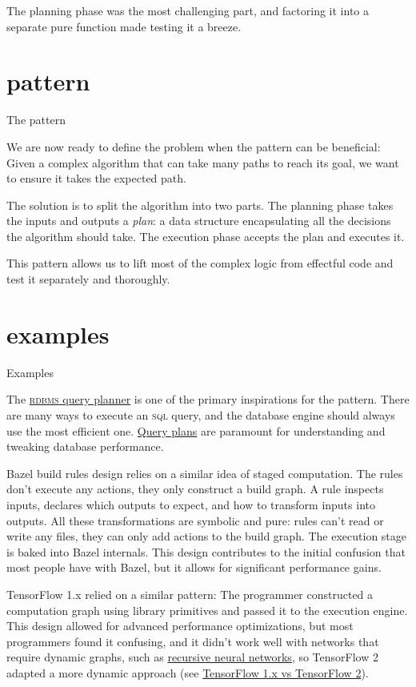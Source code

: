 \documentclass{article}
\begin{document}
The planning phase was the most challenging part, and factoring it into a separate pure function made testing it a breeze.

\section{pattern}{The pattern}

We are now ready to define the problem when the pattern can be beneficial:
Given a complex algorithm that can take many paths to reach its goal, we want to ensure it takes the expected path.

The solution is to split the algorithm into two parts.
The planning phase takes the inputs and outputs a \emph{plan}: a data structure encapsulating all the decisions the algorithm should take.
The execution phase accepts the plan and executes it.

This pattern allows us to lift most of the complex logic from effectful code and test it separately and thoroughly.

\section{examples}{Examples}

The \href{https://en.wikipedia.org/wiki/Query_plan}{\textsc{rdbms} query planner} is one of the primary inspirations for the pattern.
There are many ways to execute an \textsc{sql} query, and the database engine should always use the most efficient one.
\href{https://en.wikipedia.org/wiki/Query_plan}{Query plans} are paramount for understanding and tweaking database performance.

Bazel build rules design relies on a similar idea of staged computation.
The rules don't execute any actions, they only construct a build graph.
A rule inspects inputs, declares which outputs to expect, and how to transform inputs into outputs.
All these transformations are symbolic and pure: rules can't read or write any files, they can only add actions to the build graph.
The execution stage is baked into Bazel internals.
This design contributes to the initial confusion that most people have with Bazel, but it allows for significant performance gains.

TensorFlow 1.x relied on a similar pattern:
The programmer constructed a computation graph using library primitives and passed it to the execution engine.
This design allowed for advanced performance optimizations, but most programmers found it confusing, and it didn't work well with networks that require dynamic graphs, such as \href{https://en.wikipedia.org/wiki/Recursive_neural_network}{recursive neural networks},
so TensorFlow 2 adapted a more dynamic approach (see \href{https://www.tensorflow.org/guide/migrate/tf1_vs_tf2}{TensorFlow 1.x vs TensorFlow 2}).
\end{document}
